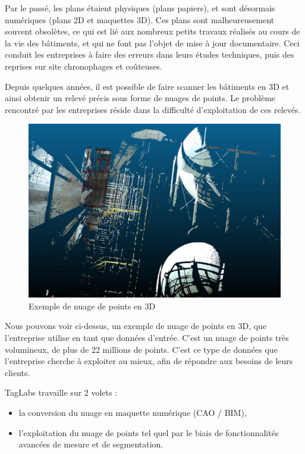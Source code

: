 \documentclass[12pt,titlepage,french]{article}
\begin{document}
Par le passé, les plans étaient physiques (plans papiers), et sont désormais numériques (plans 2D et maquettes 3D). Ces plans sont malheureusement souvent obsolètes, ce qui est lié aux nombreux petits travaux réalisés au cours de la vie des bâtiments, et qui ne font pas l’objet de mise à jour documentaire. Ceci conduit les entreprises à faire des erreurs dans leurs études techniques, puis des reprises sur site chronophages et coûteuses. \newline

Depuis quelques années, il est possible de faire scanner les bâtiments en 3D et ainsi obtenir un relevé précis sous forme de nuages de points. Le problème rencontré par les entreprises réside dans la difficulté d’exploitation de ces relevés.\newline

\begin{figure}[H]
\center
\includegraphics[width=1\textwidth]{./img/exemple_ndp.PNG}
    \caption{\label{} Exemple de nuage de points en 3D}
\end{figure}

Nous pouvons voir ci-dessus, un exemple de nuage de points en 3D, que l'entreprise utilise en tant que données d'entrée. C'est un nuage de points très volumineux, de plus de 22 millions de points. C'est ce type de données que l'entreprise cherche à exploiter au mieux, afin de répondre aux besoins de leurs clients.\newline

TagLabs travaille sur 2 volets :

\begin{itemize}
    \item la conversion du nuage en maquette numérique (CAO / BIM),
    \item l’exploitation du nuage de points tel quel par le biais de fonctionnalités avancées de mesure et de segmentation. \newline
\end{itemize}
\end{document}
